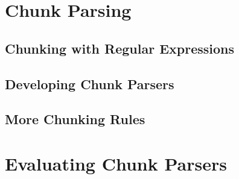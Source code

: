 \documentclass{beamer}             %
\begin{document}
\section{Chunk Parsing}

\subsection{Chunking with Regular Expressions}

\subsection{Developing Chunk Parsers}

\subsection{More Chunking Rules}

\section{Evaluating Chunk Parsers}
\end{document}
